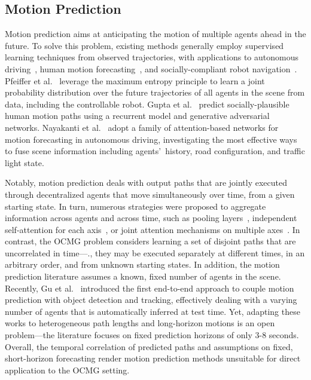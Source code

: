\subsection{Motion Prediction}
Motion prediction aims at anticipating the motion of multiple agents ahead in the future.
To solve this problem, existing methods generally employ supervised learning techniques from observed trajectories, with applications to autonomous driving~\cite{yuan2021agentformer,ngiam2022scenetr,varadarajan2022multipath++,nayakanti2023wayformer}, human motion forecasting~\cite{alahi2016social,gupta2018social,rudenko2020humanpredictionsurvey}, and socially-compliant robot navigation~\cite{kretzschmar2013featuretrajpred,kretzschmar2014learningsocialnavigation,pfeiffer2016predicting}. 
%
Pfeiffer et al.~\cite{pfeiffer2016predicting} leverage the maximum entropy principle to learn a joint probability distribution over the future trajectories of all agents in the scene from data, including the controllable robot.
Gupta et al.~\cite{gupta2018social} predict socially-plausible human motion paths using a recurrent model and generative adversarial networks.
Nayakanti et al.~\cite{nayakanti2023wayformer} adopt a family of attention-based networks for motion forecasting in autonomous driving, investigating the most effective ways to fuse scene information including agents'~history, road configuration, and traffic light state.
%

Notably, motion prediction deals with output paths that are jointly executed through decentralized agents that move simultaneously over time, from a given starting state.
In turn, numerous strategies were proposed to aggregate information across agents and across time, such as
pooling layers~\cite{alahi2016social,gupta2018social}, independent self-attention for each axis~\cite{yu2020spatiotemporal}, or joint attention mechanisms on multiple axes~\cite{yuan2021agentformer,ngiam2022scenetr,nayakanti2023wayformer}.
%
In contrast, the OCMG problem considers learning a set of disjoint paths that are uncorrelated in time---\eg., they may be executed separately at different times, in an arbitrary order, and from unknown starting states.
%
In addition, the motion prediction literature assumes a known, fixed number of agents in the scene. Recently, Gu et al.~\cite{gu2023vip3d} introduced the first end-to-end approach to couple motion prediction with object detection and tracking, effectively dealing with a varying number of agents that is automatically inferred at test time.
Yet, adapting these works to heterogeneous path lengths and long-horizon motions is an open problem---the literature focuses on fixed prediction horizons of only 3-8 seconds.
Overall, the temporal correlation of predicted paths and assumptions on fixed, short-horizon forecasting render motion prediction methods unsuitable for direct application to the OCMG setting.

